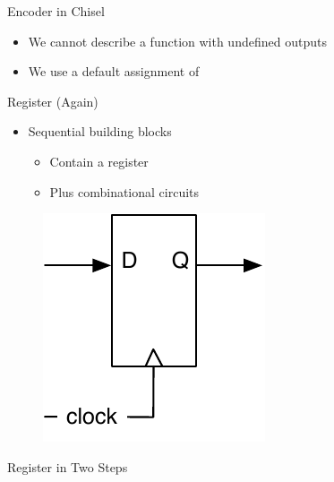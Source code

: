 \begin{frame}[fragile]{Encoder in Chisel}
\begin{itemize}
\item We cannot describe a function with undefined outputs
\item We use a default assignment of 
\end{itemize}

\end{frame}

\begin{frame}[fragile]{Register (Again)}
\begin{itemize}
\item Sequential building blocks
\begin{itemize}
\item Contain a register
\item Plus combinational circuits
\end{itemize}
\end{itemize}
\begin{figure}
  \includegraphics[scale=\scale]{../figures/register}
\end{figure}
\end{frame}



\begin{frame}[fragile]{Register in Two Steps}
\end{frame}

